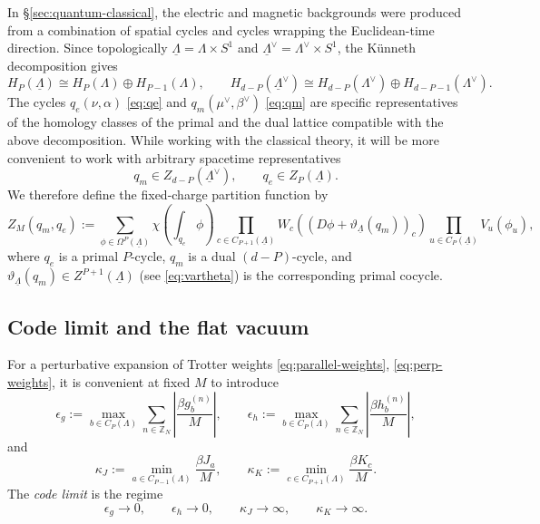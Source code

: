 In \S\ref{sec:quantum-classical}, the electric and magnetic backgrounds were produced
from a combination of spatial cycles and cycles wrapping the Euclidean-time direction. Since topologically
\(\underline\Lambda=\Lambda\times S^1\) and
\(\underline\Lambda^\vee=\Lambda^\vee\times S^1\), the K\"unneth decomposition gives
\begin{equation}
	H_P(\underline\Lambda)
	\cong
	H_P(\Lambda)\oplus H_{P-1}(\Lambda),
	\qquad
	H_{d-P}(\underline\Lambda^\vee)
	\cong
	H_{d-P}(\Lambda^\vee)\oplus H_{d-P-1}(\Lambda^\vee).
	\label{eq:kunneth}
\end{equation}
The cycles $q_e(\nu,\alpha)$ \eqref{eq:qe} and $q_m(\mu^\vee,\beta^\vee)$ \eqref{eq:qm} are specific representatives of the homology classes of the primal and the dual lattice compatible with the above decomposition. While working with the classical theory, it will be more convenient to work with arbitrary spacetime representatives
\begin{equation}
	q_m\in Z_{d-P}(\underline\Lambda^\vee),
	\qquad
	q_e\in Z_P(\underline\Lambda).
\end{equation}
We therefore define the fixed-charge partition function by
\begin{equation}
	Z_M(q_m,q_e)
	:=
	\sum_{\phi\in \Omega^P(\underline\Lambda)}
	\chi \left(\int_{q_e}\phi\right)
	\prod_{c\in C_{P+1}(\underline\Lambda)}
	W_c \left((D\phi+\vartheta_{\underline\Lambda}(q_m))_c\right)
	\prod_{u\in C_P(\underline\Lambda)}
	V_u(\phi_u),
	\label{eq:Zme}
\end{equation}
where \(q_e\) is a primal \(P\)-cycle, \(q_m\) is a dual \((d-P)\)-cycle, and
\(\vartheta_{\underline\Lambda}(q_m)\in Z^{P+1}(\underline\Lambda)\) (see \eqref{eq:vartheta}) is the corresponding
primal cocycle.


\subsection{Code limit and the flat vacuum}
\label{sec:fixed-charge-code-limit}

For a perturbative expansion of Trotter weights \eqref{eq:parallel-weights}, \eqref{eq:perp-weights}, it is convenient at fixed
\(M\) to introduce
\begin{equation}
	\epsilon_g
	:=
	\max_{b\in C_P(\Lambda)}
	\sum_{n\in \mathbb Z_N}\left|\frac{\beta g_b^{(n)}}{M}\right|,
	\qquad
	\epsilon_h
	:=
	\max_{b\in C_P(\Lambda)}
	\sum_{n\in \mathbb Z_N}\left|\frac{\beta h_b^{(n)}}{M}\right|,
\end{equation}
and
\begin{equation}
	\kappa_J
	:=
	\min_{a\in C_{P-1}(\Lambda)}\frac{\beta J_a}{M},
	\qquad
	\kappa_K
	:=
	\min_{c\in C_{P+1}(\Lambda)}\frac{\beta K_c}{M}.
\end{equation}
The \emph{code limit} is the regime
\begin{equation}
	\epsilon_g\to 0,
	\qquad
	\epsilon_h\to 0,
	\qquad
	\kappa_J\to \infty,
	\qquad
	\kappa_K\to \infty.
	\label{eq:codeLimit}
\end{equation}

